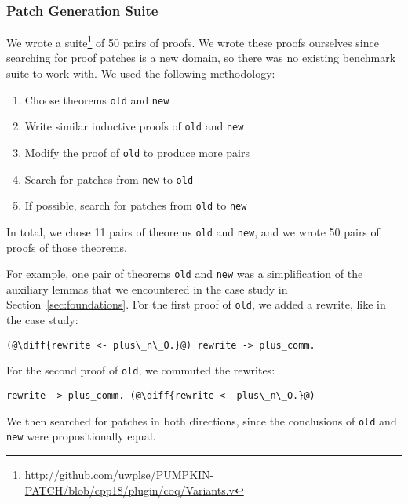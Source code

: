 \subsubsection{Patch Generation Suite}
\label{sec:suite}

We wrote a suite\footnote{\url{http://github.com/uwplse/PUMPKIN-PATCH/blob/cpp18/plugin/coq/Variants.v}} of 50 pairs of proofs.
We wrote these proofs ourselves since searching for proof patches is a new domain,
so there was no existing benchmark suite to work with.
We used the following methodology:

\begin{enumerate}
\item Choose theorems \lstinline{old} and \lstinline{new}
\item Write similar inductive proofs of \lstinline{old} and \lstinline{new}
\item Modify the proof of \lstinline{old} to produce more pairs
\item Search for patches from \lstinline{new} to \lstinline{old}
\item If possible, search for patches from \lstinline{old} to \lstinline{new}
\end{enumerate}

In total, we chose 11 pairs of theorems \lstinline{old} and \lstinline{new}, and we wrote
50 pairs of proofs of those theorems.

For example, one pair of theorems \lstinline{old} and \lstinline{new} was a 
simplification of the auxiliary lemmas
that we encountered in the case study in Section~\ref{sec:foundations}.
For the first proof of \lstinline{old}, we added a rewrite, like in the case study:

\begin{lstlisting}[language=coq]
    (@\diff{rewrite <- plus\_n\_O.}@) rewrite -> plus_comm.
\end{lstlisting}

For the second proof of \lstinline{old}, we commuted the rewrites:

\begin{lstlisting}[language=coq]
    rewrite -> plus_comm. (@\diff{rewrite <- plus\_n\_O.}@)
\end{lstlisting} 

We then searched for patches in both directions,
since the conclusions of \lstinline{old}
and \lstinline{new} were propositionally equal.

